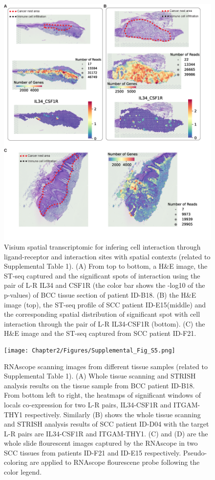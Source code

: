 \begin{figure}[htp]
    \centering
    \includegraphics[width=0.75\columnwidth]{Chapter2/Figures/Supplemental_Fig_S4.png}
    \caption{Visium spatial transcriptomic for infering cell interaction through ligand-receptor and interaction sites with spatial contexts (related to Supplemental Table 1). (A) From top to bottom, a H\&E image, the ST-seq captured and the significant spots of interaction using the pair of L-R IL34 and CSF1R (the color bar shows the -log10 of the p-values) of BCC tissue section of patient ID-B18. (B) the H\&E image (top), the ST-seq profile of SCC patient ID-E15(middle) and the corresponding spatial distribution of significant spot with cell interaction through the pair of L-R IL34-CSF1R (bottom). (C) the H\&E image and the ST-seq captured from SCC patient ID-F21. }
    \label{fig:Chap2_Supfigure4}
\end{figure}
\begin{figure}[htp]
    \centering
    \texttt{[image: Chapter2/Figures/Supplemental\_Fig\_S5.png]}
    \caption{RNAscope scanning images from different tissue samples (related to Supplemental Table 1). (A) Whole tissue scanning and STRISH analysis results on the tissue sample from BCC patient ID-B18. From bottom left to right, the heatmaps of significant windows of locals co-expression for two L-R pairs, IL34-CSF1R and ITGAM-THY1 respectively. Similarly (B) shows the whole tissue scanning and STRISH analysis results of SCC patient ID-D04 with the target L-R pairs are IL34-CSF1R and ITGAM-THY1. (C) and (D) are the whole slide flourescent images captured by the RNAscope in two SCC tissues from patients ID-F21 and ID-E15 respectively. Pseudo-coloring are applied to RNAscope flourescene probe following the color legend.}
    \label{fig:Chap2_Supfigure5}
\end{figure}
